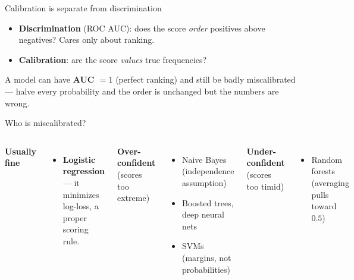 \documentclass[aspectratio=169]{beamer}
\begin{document}
\begin{frame}{Calibration is separate from discrimination}
  \begin{itemize}
    \item \textbf{Discrimination} (ROC AUC): does the score \emph{order} positives above
      negatives? Cares only about ranking.
    \item \textbf{Calibration}: are the score \emph{values} true frequencies?
  \end{itemize}
  \vfill
  A model can have \textbf{AUC $=1$} (perfect ranking) and still be badly miscalibrated ---
  halve every probability and the order is unchanged but the numbers are wrong.
  \vfill
\end{frame}

\begin{frame}{Who is miscalibrated?}
  \begin{columns}[T]
    \textbf{Usually fine}
    \begin{itemize}\small
      \item \textbf{Logistic regression} --- it minimizes log-loss, a proper scoring rule.
    \end{itemize}
    \vskip 2pt
    \textbf{Over-confident} (scores too extreme)
    \begin{itemize}\small
      \item Naive Bayes (independence assumption)
      \item Boosted trees, deep neural nets
      \item SVMs (margins, not probabilities)
    \end{itemize}
    \textbf{Under-confident} (scores too timid)
    \begin{itemize}\small
      \item Random forests (averaging pulls toward $0.5$)
    \end{itemize}
    \vskip 6pt
  \end{columns}
\end{frame}
\end{document}
